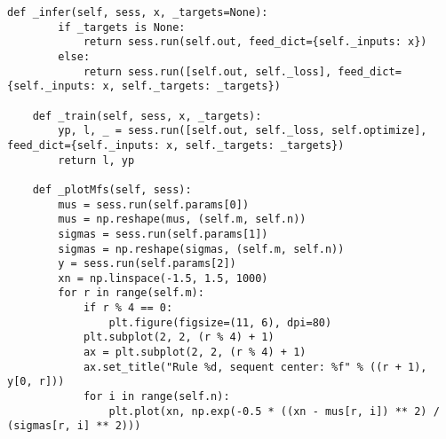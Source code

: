 \begin{ListingEnv}[!h]
\begin{lstlisting}[language={[ISO]PYTHON}]
    def _infer(self, sess, x, _targets=None):
        if _targets is None:
            return sess.run(self.out, feed_dict={self._inputs: x})
        else:
            return sess.run([self.out, self._loss], feed_dict={self._inputs: x, self._targets: _targets})

    def _train(self, sess, x, _targets):
        yp, l, _ = sess.run([self.out, self._loss, self.optimize], feed_dict={self._inputs: x, self._targets: _targets})
        return l, yp

    def _plotMfs(self, sess):
        mus = sess.run(self.params[0])
        mus = np.reshape(mus, (self.m, self.n))
        sigmas = sess.run(self.params[1])
        sigmas = np.reshape(sigmas, (self.m, self.n))
        y = sess.run(self.params[2])
        xn = np.linspace(-1.5, 1.5, 1000)
        for r in range(self.m):
            if r % 4 == 0:
                plt.figure(figsize=(11, 6), dpi=80)
            plt.subplot(2, 2, (r % 4) + 1)
            ax = plt.subplot(2, 2, (r % 4) + 1)
            ax.set_title("Rule %d, sequent center: %f" % ((r + 1), y[0, r]))
            for i in range(self.n):
                plt.plot(xn, np.exp(-0.5 * ((xn - mus[r, i]) ** 2) / (sigmas[r, i] ** 2)))
    \end{lstlisting}
\end{ListingEnv}%






